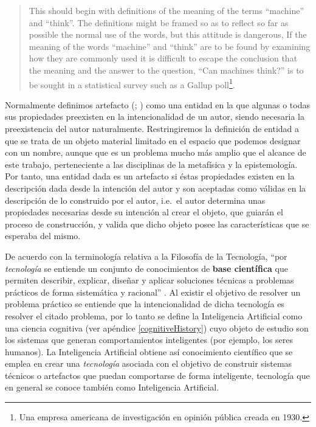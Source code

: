 \documentclass[12pt]{memoir}
\begin{document}
\begin{quotation}
This should begin with definitions of the meaning of the terms ``machine'' and ``think''. The definitions might be framed so as to reflect so far as possible the normal use of the words, but this attitude is dangerous, If the meaning of the words ``machine'' and ``think'' are to be found by examining how they are commonly used it is difficult to escape the conclusion that the meaning and the answer to the question, ``Can machines think?'' is to be sought in a statistical survey such as a Gallup poll\footnote{Una empresa americana de investigación en opinión pública creada en 1930.}. \parencite[apartado 1]{Turing1950cmi}
\end{quotation}

Normalmente definimos artefacto (\cite[apartado 2.5]{sep-technology}; \cite[apartado 4]{sep-artifact}) como una entidad en la que algunas o todas sus propiedades preexisten en la intencionalidad de un autor, siendo necesaria la preexistencia del autor naturalmente. Restringiremos la definición de entidad a que se trata de un objeto material limitado en el espacio que podemos designar con un nombre, aunque que es un problema mucho más amplio que el alcance de este trabajo, perteneciente a las disciplinas de la metafísica y la epistemología. Por tanto, una entidad dada es un artefacto si éstas propiedades existen en la descripción dada desde la intención del autor y son aceptadas como válidas en la descripción de lo construido por el autor, i.e.\ el autor determina unas propiedades necesarias desde su intención al crear el objeto, que guiarán el proceso de construcción, y valida que dicho objeto posee las características que se esperaba del mismo.

De acuerdo con la terminología relativa a la Filosofía de la Tecnología, ``por \textit{tecnología} se entiende un conjunto de conocimientos de \textbf{base científica} que permiten describir, explicar, diseñar y aplicar soluciones técnicas a problemas prácticos de forma sistemática y racional'' \parencite[p. 2]{quintanillaRef}. Al existir el objetivo de resolver un problema práctico se entiende que la intencionalidad de dicha tecnología es resolver el citado problema, por lo tanto se define la Inteligencia Artificial como una ciencia cognitiva (ver apéndice \ref{cognitiveHistory}) cuyo objeto de estudio son los sistemas que generan comportamientos inteligentes (por ejemplo, los seres humanos). La Inteligencia Artificial obtiene así conocimiento científico que se emplea en crear una \textit{tecnología} asociada con el objetivo de construir sistemas técnicos o artefactos que puedan comportarse de forma inteligente, tecnología que en general se conoce también como Inteligencia Artificial.
\end{document}
